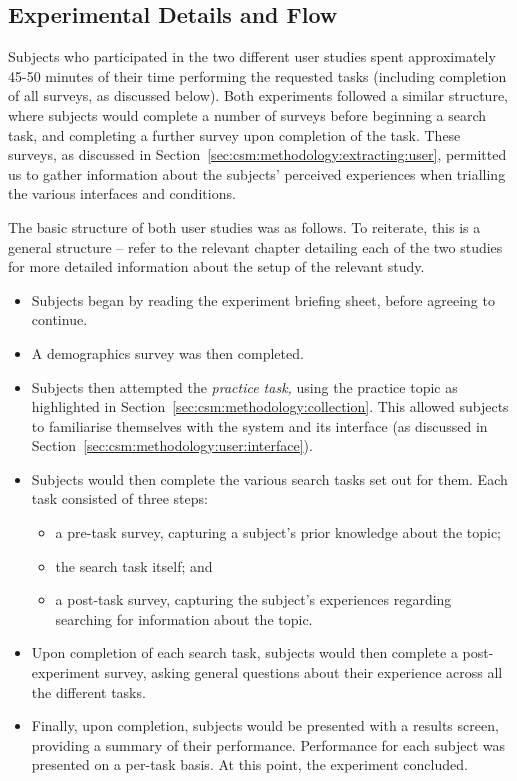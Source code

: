 \subsection{Experimental Details and Flow}\label{sec:csm:methodology:user:flow}
Subjects who participated in the two different user studies spent approximately 45-50 minutes of their time performing the requested tasks (including completion of all surveys, as discussed below). Both experiments followed a similar structure, where subjects would complete a number of surveys before beginning a search task, and completing a further survey upon completion of the task. These surveys, as discussed in Section~\ref{sec:csm:methodology:extracting:user}, permitted us to gather information about the subjects' perceived experiences when trialling the various interfaces and conditions.

The basic structure of both user studies was as follows. To reiterate, this is a general structure -- refer to the relevant chapter detailing each of the two studies for more detailed information about the setup of the relevant study.

\begin{itemize}
    \item{Subjects began by reading the experiment briefing sheet, before agreeing to continue.}
    \item{A demographics survey was then completed.}
    \item{Subjects then attempted the \emph{practice task,} using the practice topic as highlighted in Section~\ref{sec:csm:methodology:collection}. This allowed subjects to familiarise themselves with the system and its interface (as discussed in Section~\ref{sec:csm:methodology:user:interface}).}
    \item{Subjects would then complete the various search tasks set out for them. Each task consisted of three steps:}
    
    \begin{itemize}
        \item{a pre-task survey, capturing a subject's prior knowledge about the topic;}
        \item{the search task itself; and}
        \item{a post-task survey, capturing the subject's experiences regarding searching for information about the topic.}
    \end{itemize}
    
    \item{Upon completion of each search task, subjects would then complete a post-experiment survey, asking general questions about their experience across all the different tasks.}
    \item{Finally, upon completion, subjects would be presented with a results screen, providing a summary of their performance. Performance for each subject was presented on a per-task basis. At this point, the experiment concluded.}
\end{itemize}

